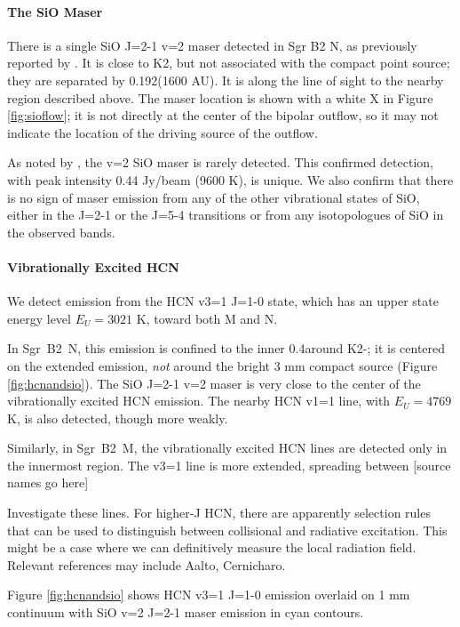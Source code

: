 \documentclass[twocolumn]{aastex61}
\newcommand{\sgrbtwon}{Sgr~B2~N}
\newcommand{\sgrbtwom}{Sgr~B2~M}
\begin{document}
\paragraph{The SiO Maser}
There is a single SiO J=2-1 v=2 maser detected in Sgr B2 N, as previously
reported by \citet{Higuchi2015a}.  It is close to K2,
but not associated with the compact point source; they are separated
by 0.192\arcsec (1600 AU).  It is along the
line of sight to the nearby \hii region described above.
The maser location is shown with a white X in Figure \ref{fig:sioflow}; it is
not directly at the center of the bipolar outflow, so it may not indicate
the location of the driving source of the outflow.

As noted by \citet{Higuchi2015a}, the v=2 SiO maser is rarely detected.  This
confirmed detection, with peak intensity 0.44 Jy/beam (9600 K), is unique.  We also
confirm that there is no sign of maser emission from any of the other
vibrational states of SiO, either in the J=2-1 or the J=5-4 transitions
or from any isotopologues of SiO in the observed bands.

\paragraph{Vibrationally Excited HCN}
We detect emission from the HCN v3=1 J=1-0 state, which has an upper state
energy level $E_U = 3021$ K, toward both M and N.

In \sgrbtwon, this emission is confined to the inner 0.4\arcsec around K2-\hii;
it is centered on the extended emission, \emph{not} around the bright 3 mm
compact source (Figure \ref{fig:hcnandsio}).  The SiO J=2-1 v=2 maser is very
close to the center of the vibrationally excited HCN emission.  The nearby HCN
v1=1 line, with $E_U=4769$ K, is also detected, though more weakly.

Similarly, in \sgrbtwom, the vibrationally excited HCN lines are detected only
in the innermost region.  The v3=1 line is more extended, spreading between [source names go here]

{\color{red} Investigate these lines.  For higher-J HCN, there are apparently
selection rules that can be used to distinguish between collisional and radiative
excitation.  This might be a case where we can definitively measure the local
radiation field.
Relevant references may include Aalto, Cernicharo.
}

Figure \ref{fig:hcnandsio} shows HCN v3=1 J=1-0 emission overlaid on 1 mm continuum
with SiO v=2 J=2-1 maser emission in cyan contours.
\end{document}
